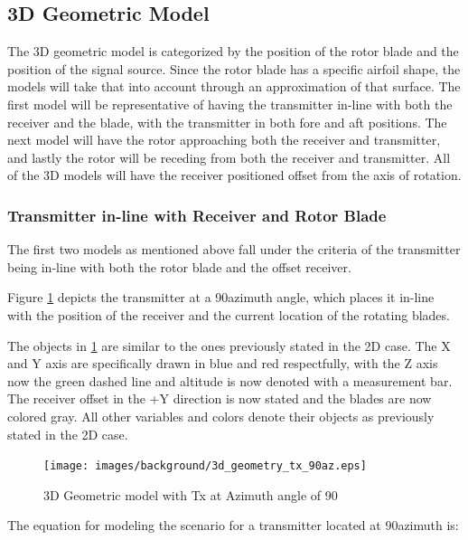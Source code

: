 \subsection{3D Geometric Model}
The 3D geometric model is categorized by the position of the rotor blade and the position of the signal source. Since the rotor blade has a specific airfoil shape, the models will take that into account through an approximation of that surface. The first model will be representative of having the transmitter in-line with both the receiver and the blade, with the transmitter in both fore and aft positions. The next model will have the rotor approaching both the receiver and transmitter, and lastly the rotor will be receding from both the receiver and transmitter. All of the 3D models will have the receiver positioned offset from the axis of rotation.

\subsubsection{Transmitter in-line with Receiver and Rotor Blade}
The first two models as mentioned above fall under the criteria of the transmitter being in-line with both the rotor blade and the offset receiver. 

Figure \ref{fig:3D_model_90az} depicts the transmitter at a 90\textdegree \space azimuth angle, which places it in-line with the position of the receiver and the current location of the rotating blades. 

The objects in \ref{fig:3D_model_90az}  are similar to the ones previously stated in the 2D case. The X and Y axis are specifically drawn in blue and red respectfully, with the Z axis now the green dashed line and altitude is now denoted with a measurement bar. The receiver offset in the +Y direction is now stated and the blades are now colored gray. All other variables and colors denote their objects as previously stated in the 2D case. 

\begin{figure}
	\begin{center}
		\texttt{[image: images/background/3d\_geometry\_tx\_90az.eps]}
		\caption{3D Geometric model with Tx at Azimuth angle of 90\textdegree}
		\label{fig:3D_model_90az}
	\end{center}
\end{figure}

The equation for modeling the scenario for a transmitter located at 90\textdegree \space azimuth is:


